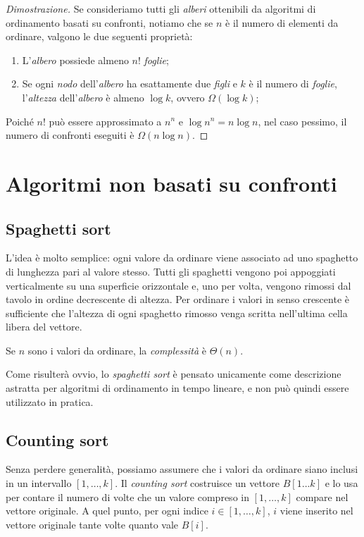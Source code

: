 \begin{proof}[Dimostrazione]
    Se consideriamo tutti gli \emph{alberi} ottenibili da algoritmi di
    ordinamento basati su confronti, notiamo che se $n$ è il numero di elementi
    da ordinare, valgono le due seguenti proprietà:
    \begin{enumerate}
        \item L'\emph{albero} possiede almeno $n!$ \emph{foglie};
        \item Se ogni \emph{nodo} dell'\emph{albero} ha esattamente due \emph{figli}
        e $k$ è il numero di \emph{foglie}, l'\emph{altezza} dell'\emph{albero} è
        almeno $\log k$, ovvero $\Omega(\log k)$;
    \end{enumerate}
    Poiché $n!$ può essere approssimato a $n^n$ e $\log n^n=n\log n$, nel caso
    pessimo, il numero di confronti eseguiti è $\Omega(n\log n)$.
\end{proof}

\section{Algoritmi non basati su confronti}
\subsection{Spaghetti sort}
L'idea è molto semplice: ogni valore da ordinare viene associato ad uno spaghetto
di lunghezza pari al valore stesso. Tutti gli spaghetti vengono poi appoggiati
verticalmente su una superficie orizzontale e, uno per volta, vengono rimossi
dal tavolo in ordine decrescente di altezza. Per ordinare i valori in senso
crescente è sufficiente che l'altezza di ogni spaghetto rimosso venga scritta
nell'ultima cella libera del vettore.

\bigskip\noindent
Se $n$ sono i valori da ordinare, la \emph{complessità} è $\Theta(n)$.

\begin{note}
    Come risulterà ovvio, lo \emph{spaghetti sort} è pensato unicamente come
    descrizione astratta per algoritmi di ordinamento in tempo lineare, e non
    può quindi essere utilizzato in pratica.
\end{note}

\subsection{Counting sort}
Senza perdere generalità, possiamo assumere che i valori da ordinare siano
inclusi in un intervallo $[1,\dots,k]$. Il \emph{counting sort} costruisce un
vettore $B[1\dots k]$ e lo usa per contare il numero di volte che un valore
compreso in $[1,\dots,k]$ compare nel vettore originale. A quel punto, per ogni
indice $i\in[1,\dots,k]$, $i$ viene inserito nel vettore originale tante volte
quanto vale $B[i]$.

